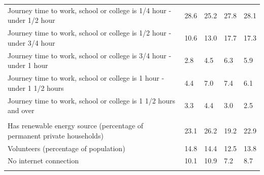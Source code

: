 \documentclass{article}
\begin{document}
\begin{table}[h]
\begin{tabular}{KTTTT}
Journey time to work, school or college is 1/4 hour - under 1/2 hour & 28.6& 25.2& 27.8& 28.1\\
Journey time to work, school or college is 1/2 hour - under 3/4 hour & 10.6& 13.0& 17.7& 17.3\\
Journey time to work, school or college is 3/4 hour - under 1 hour & 2.8& 4.5& 6.3& 5.9\\
Journey time to work, school or college is 1 hour - under 1 1/2 hours & 4.4& 7.0& 7.4& 6.1\\
Journey time to work, school or college is 1 1/2 hours and over & 3.3& 4.4& 3.0& 2.5\\
\hline
    \\ 
    \hline
Has renewable energy source (percentage of permanent private households) & 23.1& 26.2& 19.2& 22.9\\
    \hline
Volunteers (percentage of population) & 14.8& 14.4& 12.5& 13.8\\
    \hline
No internet connection& 10.1& 10.9&  7.2&  8.7\\
\hline
\end{tabular}
\end{table}
\end{document}
